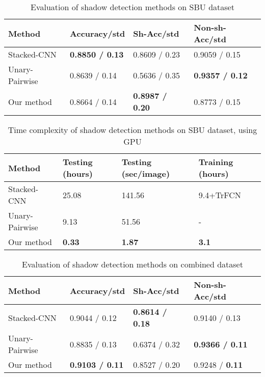 \documentclass[letterpaper, 10 pt, conference]{ieeeconf}
\begin{document}
\begin {table}[t]
\caption[Evaluation of shadow detection methods on SBU dataset]{Evaluation of shadow detection methods on SBU dataset} \label{tab:sbu_res}
\begin{center}
\begin{tabular}{ |p{1.77cm}||p{1.48cm}|p{1.48cm}|p{1.55cm}|  }
\hline
 Method& Accuracy/std& Sh-Acc/std& Non-sh-Acc/std\\
 \hline
 Stacked-CNN & \textbf{0.8850 / 0.13} & 0.8609 / 0.23 &  0.9059 / 0.15\\
 Unary-Pairwise &   0.8639 / 0.14  & 0.5636 / 0.35  & \textbf{0.9357 / 0.12}\\
 Our method & 0.8664 / 0.14 & \textbf{0.8987 / 0.20} &  0.8773 / 0.15\\
 \hline
\end {tabular}
\end{center}
\end {table}
\begin {table}[t]
\caption[Time complexity of shadow detection methods on SBU dataset, using GPU]{Time complexity of shadow detection methods on SBU dataset, using GPU} \label{tab:sbu_time_gpu}
\begin{center}
\begin{tabular}{ |p{1.77cm}||p{1.48cm}|p{1.48cm}|p{1.55cm}|   }
\hline
Method& Testing (hours)& Testing (sec/image) & Training (hours)\\
 \hline
 Stacked-CNN    & 25.08 & 141.56 & 9.4+TrFCN\\
 Unary-Pairwise&   9.13 & 51.56& -\\
 Our method & \textbf{0.33} & \textbf{1.87}& \textbf{3.1}\\
 \hline
\end {tabular}
\end{center}
\end {table}
\begin {table}[b]
\caption[Evaluation of shadow detection methods on combined dataset]{Evaluation of shadow detection methods on combined dataset} \label{tab:combined_res}
\begin{center}
\begin{tabular}{ |p{1.77cm}||p{1.48cm}|p{1.48cm}|p{1.55cm}|  }
\hline
 Method& Accuracy/std& Sh-Acc/std& Non-sh-Acc/std\\
 \hline
 Stacked-CNN  & 0.9044 / 0.12 & \textbf{0.8614 / 0.18} &  0.9140 / 0.13\\
 Unary-Pairwise&   0.8835 / 0.13  & 0.6374 / 0.32  & \textbf{0.9366 / 0.11}\\
 Our method & \textbf{0.9103 / 0.11} & 0.8527 / 0.20 &  0.9248 / \textbf{0.11}\\
 \hline
\end {tabular}
\end{center}
\end {table}
\end{document}
